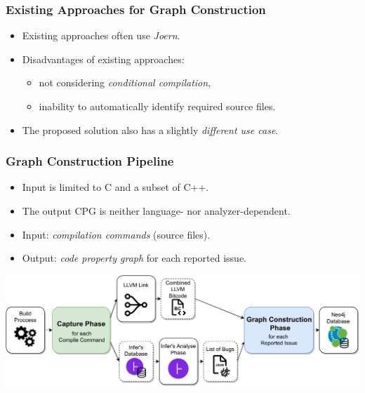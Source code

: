 \documentclass[10pt,xcolor=pdflatex,hyperref={unicode}]{beamer}
\begin{document}
\begin{frame}
\frametitle{Existing Approaches for Graph Construction}
\doublespacing

    \begin{itemize}
        \item Existing approaches often use \emph{Joern}.
        \item Disadvantages of existing approaches:
        \begin{itemize}
            \item not considering \emph{conditional compilation},
            \doublespacing
            \item inability to automatically identify required source files.
        \end{itemize}
        \item The proposed solution also has a slightly \emph{different use case}.
    \end{itemize}
\end{frame}


\begin{frame}\frametitle{Graph Construction Pipeline}
\doublespacing

    \begin{itemize}
    \item Input is limited to C and a subset of C++.
        \item The output CPG is neither language- nor analyzer-dependent.
        \item \alert{Input}: \emph{compilation commands} (source files).
        \item \alert{Output}: \emph{code property graph} for each reported issue.
    \end{itemize}
    \vspace{0.5cm}
    \hspace{-0.77cm}
    \includegraphics[width=1.13\textwidth]{img/all-modified.drawio.pdf}
\end{frame}
\end{document}
